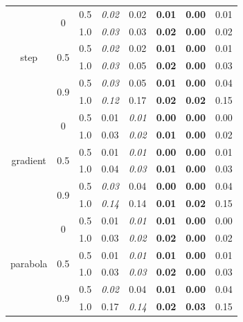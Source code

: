 \documentclass[authoryear,review, 12pt]{elsarticle}
\begin{document}
\begin{table}
\begin{tabular}{|ccc|ccc|cc|}
  \multirow{6}{*}{step} & \multirow{2}{*}{0} & 0.5 & \emph{0.02} & 0.02 & \textbf{0.01} & \textbf{0.00} & 0.01 \\ 
    &  & 1.0 & \emph{0.03} & 0.03 & \textbf{0.02} & \textbf{0.00} & 0.02 \\ 
    & \multirow{2}{*}{0.5} & 0.5 & \emph{0.02} & 0.02 & \textbf{0.01} & \textbf{0.00} & 0.01 \\ 
    &  & 1.0 & \emph{0.03} & 0.05 & \textbf{0.02} & \textbf{0.00} & 0.03 \\ 
    & \multirow{2}{*}{0.9} & 0.5 & \emph{0.03} & 0.05 & \textbf{0.01} & \textbf{0.00} & 0.04 \\ 
    &  & 1.0 & \emph{0.12} & 0.17 & \textbf{0.02} & \textbf{0.02} & 0.15 \\ 
   \hline \multirow{6}{*}{gradient} & \multirow{2}{*}{0} & 0.5 & 0.01 & \emph{0.01} & \textbf{0.00} & \textbf{0.00} & 0.00 \\ 
    &  & 1.0 & 0.03 & \emph{0.02} & \textbf{0.01} & \textbf{0.00} & 0.02 \\ 
    & \multirow{2}{*}{0.5} & 0.5 & 0.01 & \emph{0.01} & \textbf{0.00} & \textbf{0.00} & 0.01 \\ 
    &  & 1.0 & 0.04 & \emph{0.03} & \textbf{0.01} & \textbf{0.00} & 0.03 \\ 
    & \multirow{2}{*}{0.9} & 0.5 & \emph{0.03} & 0.04 & \textbf{0.00} & \textbf{0.00} & 0.04 \\ 
    &  & 1.0 & \emph{0.14} & 0.14 & \textbf{0.01} & \textbf{0.02} & 0.15 \\ 
   \hline \multirow{6}{*}{parabola} & \multirow{2}{*}{0} & 0.5 & 0.01 & \emph{0.01} & \textbf{0.01} & \textbf{0.00} & 0.00 \\ 
    &  & 1.0 & 0.03 & \emph{0.02} & \textbf{0.02} & \textbf{0.00} & 0.02 \\ 
    & \multirow{2}{*}{0.5} & 0.5 & 0.01 & \emph{0.01} & \textbf{0.01} & \textbf{0.00} & 0.01 \\ 
    &  & 1.0 & 0.03 & \emph{0.03} & \textbf{0.02} & \textbf{0.00} & 0.03 \\ 
    & \multirow{2}{*}{0.9} & 0.5 & \emph{0.02} & 0.04 & \textbf{0.01} & \textbf{0.00} & 0.04 \\ 
    &  & 1.0 & 0.17 & \emph{0.14} & \textbf{0.02} & \textbf{0.03} & 0.15 \\ 
  

\end{tabular}
\end{table}
\end{document}
